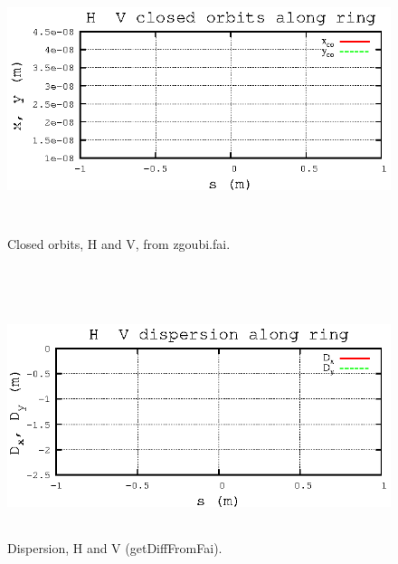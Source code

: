 \documentclass[11pt]{article}
\begin{document}
 \begin{figure}[h]
 
 \centering
 
 ~
 
 \includegraphics*[width=17cm,height=7cm]{gnuplot_CO.eps}
 \vspace{-2ex}
 \caption{ \label{FigCOxy}
 Closed orbits, H and V, from zgoubi.fai.
 }
 
 
 ~
 ~
 
 \includegraphics*[width=17cm,height=7cm]{gnuplot_DxDy.eps}
 \vspace{-2ex}
 \caption{ \label{FigDxDy}
 Dispersion, H and V (getDiffFromFai).
 }
 
 \end{figure}
 
 \clearpage
 
\end{document}
